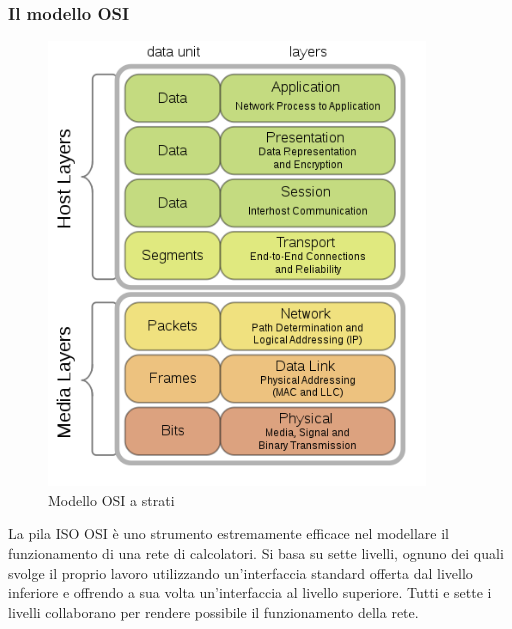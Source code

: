 \subsubsection{Il modello OSI}
\begin{figure}[ht]
    \centering
    \includegraphics[width=10cm]{figure/osi.png}
    \caption{Modello OSI a strati}
\end{figure}

La pila ISO OSI è uno strumento estremamente efficace nel modellare il funzionamento di una rete di calcolatori.
Si basa su sette livelli, ognuno dei quali svolge il proprio lavoro utilizzando un'interfaccia standard offerta dal livello inferiore e offrendo a sua volta un'interfaccia al livello superiore.
Tutti e sette i livelli collaborano per rendere possibile il funzionamento della rete.

